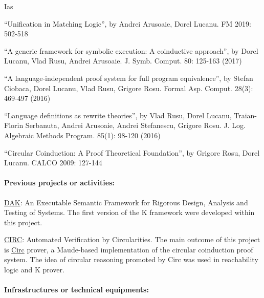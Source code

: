 \begin{sitedescription}{Ias}
\begin{compactitem}
\item ``Unification in Matching Logic'', by Andrei Arusoaie, Dorel Lucanu. FM 2019: 502-518
\item ``A generic framework for symbolic execution: A coinductive approach'', by Dorel Lucanu, Vlad Rusu, Andrei Arusoaie. J. Symb. Comput. 80: 125-163 (2017)
\item ``A language-independent proof system for full program equivalence'', by Stefan Ciobaca, Dorel Lucanu, Vlad Rusu, Grigore Rosu. Formal Asp. Comput. 28(3): 469-497 (2016)
\item ``Language definitions as rewrite theories'', by Vlad Rusu, Dorel Lucanu, Traian-Florin Serbanuta, Andrei Arusoaie, Andrei Stefanescu, Grigore Rosu. J. Log. Algebraic Methods Program. 85(1): 98-120 (2016)
\item ``Circular Coinduction: A Proof Theoretical Foundation'', by Grigore Rosu, Dorel Lucanu. CALCO 2009: 127-144
\end{compactitem}

\paragraph*{Previous projects or activities:}


\begin{compactitem}
\item \href{https://fmse.info.uaic.ro/grant/dak/}{DAK}: An Executable Semantic Framework for Rigorous Design, Analysis and Testing of Systems. The first version of the K framework were developed within this project.
\item \href{https://fmse.info.uaic.ro/grant/circ/}{CIRC}: Automated Verification by Circularities. The main outcome of this project is \href{http://fsl.cs.illinois.edu/index.php/Circ}{Circ} prover, a Maude-based implementation of the circular coinduction proof system. The idea of circular reasoning promoted by Circ was used in reachability logic and K prover.
\end{compactitem}

\paragraph*{Infrastructures or technical equipments:}



\end{sitedescription}
